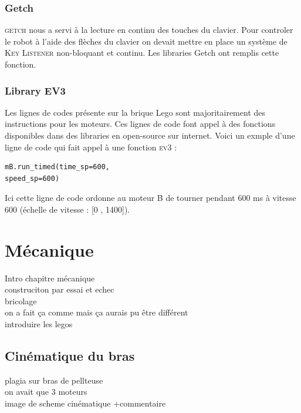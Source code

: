 \documentclass[twoside,twocolumn, 16pt]{article}
\begin{document}
\subsubsection{Getch}
\textsc{getch} nous a servi à la lecture en continu des touches du clavier. Pour controler le robot à l'aide des flèches du clavier on devait mettre en place un système de \textsc{Key Listener} non-bloquant et continu. Les libraries Getch ont remplis cette fonction.

\subsubsection{Library EV3}
Les lignes de codes présente sur la brique Lego sont majoritairement des instructions pour les moteurs. Ces lignes de code font appel à des fonctions disponibles dans des libraries en open-source sur internet. Voici un exmple d'une ligne de code qui fait appel à une fonction \textsc{ev3} : \\
\vspace{-0.5cm}
\begin{lstlisting}
mB.run_timed(time_sp=600, 
speed_sp=600)
\end{lstlisting}
Ici cette ligne de code ordonne au moteur B de tourner pendant 600 ms à vitesse 600 (échelle de vitesse : [0 , 1400]).


\section{Mécanique}

Intro chapitre mécanique \\
construciton par essai et echec \\
bricolage \\
on a fait ça comme mais ça aurais pu être différent \\
introduire les legos 

\subsection{Cinématique du bras}
plagia sur bras de pellteuse \\
on avait que 3 moteurs \\
image de scheme cinématique +commentaire \\
\end{document}
